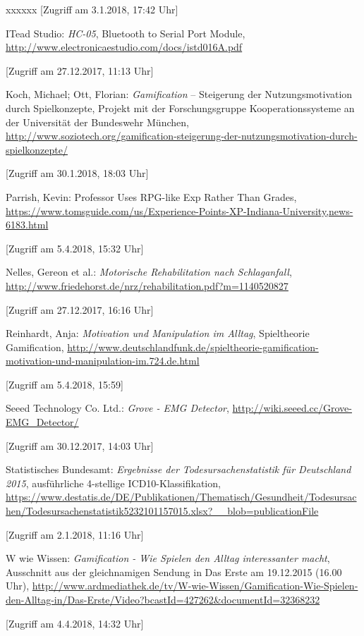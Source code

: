 \begin{thebibliography}{xxxxxx}
[Zugriff am 3.1.2018, 17:42 Uhr]

 ITead Studio: \textit{HC-05}, Bluetooth to Serial Port Module, \url{http://www.electronicaestudio.com/docs/istd016A.pdf}

[Zugriff am 27.12.2017, 11:13 Uhr]

 Koch, Michael; Ott, Florian: \textit{Gamification} – Steigerung der Nutzungsmotivation durch Spielkonzepte, Projekt mit der Forschungsgruppe Kooperationssysteme an der Universität der Bundeswehr München, \url{http://www.soziotech.org/gamification-steigerung-der-nutzungsmotivation-durch-spielkonzepte/}

[Zugriff am 30.1.2018, 18:03 Uhr]

 Parrish, Kevin: Professor Uses RPG-like Exp Rather Than Grades, \url{https://www.tomsguide.com/us/Experience-Points-XP-Indiana-University,news-6183.html}

[Zugriff am 5.4.2018, 15:32 Uhr]

 Nelles, Gereon et al.: \textit{Motorische Rehabilitation nach Schlaganfall}, \url{http://www.friedehorst.de/nrz/rehabilitation.pdf?m=1140520827}

[Zugriff am 27.12.2017, 16:16 Uhr]

 Reinhardt, Anja: \textit{Motivation und Manipulation im Alltag}, Spieltheorie \glqq Gamification\grqq , \url{http://www.deutschlandfunk.de/spieltheorie-gamification-motivation-und-manipulation-im.724.de.html}

[Zugriff am 5.4.2018, 15:59]

 Seeed Technology Co. Ltd.: \textit{Grove - EMG Detector}, \url{http://wiki.seeed.cc/Grove-EMG_Detector/}

[Zugriff am 30.12.2017, 14:03 Uhr]

 Statistisches Bundesamt: \textit{Ergebnisse der Todesursachenstatistik für Deutschland 2015}, ausführliche 4-stellige ICD10-Klassifikation, \\ \url{https://www.destatis.de/DE/Publikationen/Thematisch/Gesundheit/Todesursachen/Todesursachenstatistik5232101157015.xlsx?__blob=publicationFile}

[Zugriff am 2.1.2018, 11:16 Uhr]

 W wie Wissen: \textit{Gamification - Wie Spielen den Alltag interessanter macht}, Ausschnitt aus der gleichnamigen Sendung in Das Erste am 19.12.2015 (16.00 Uhr), \url{http://www.ardmediathek.de/tv/W-wie-Wissen/Gamification-Wie-Spielen-den-Alltag-in/Das-Erste/Video?bcastId=427262&documentId=32368232}

[Zugriff am 4.4.2018, 14:32 Uhr]
\end{thebibliography}
